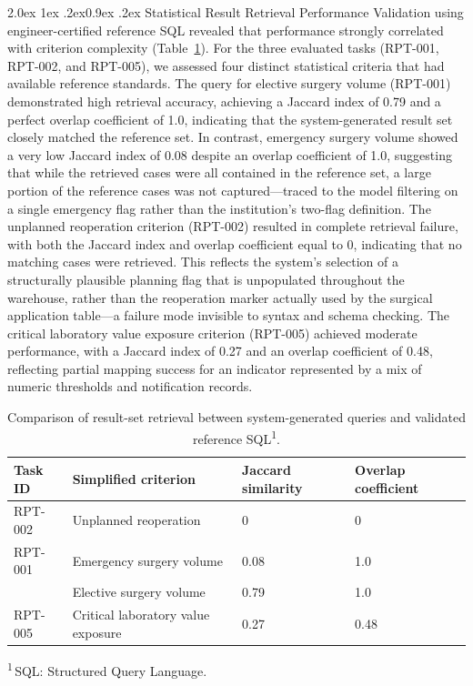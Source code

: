 \documentclass[10pt]{article}
\makeatletter
\renewcommand\subsection{\@startsection{subsection}{2}{\z@}%
  {2.0ex \@plus 1ex \@minus .2ex}{0.9ex \@plus .2ex}%
  {\normalfont\normalsize\bfseries}}
\newcommand{\tnote}[1]{\textsuperscript{#1}}
\newcommand{\tabfoot}[1]{\par\vspace{2pt}\begingroup\raggedright\footnotesize
  \noindent #1\par\endgroup}
\newcommand{\tnotedef}[1]{\textsuperscript{#1}\,}
\makeatother
\begin{document}
\subsection{Statistical Result Retrieval Performance}
Validation using engineer-certified reference SQL revealed that performance
strongly correlated with criterion complexity (Table~\ref{tab:retrieval}). For
the three evaluated tasks (RPT-001, RPT-002, and RPT-005), we assessed four
distinct statistical criteria that had available reference standards. The query
for elective surgery volume (RPT-001) demonstrated high retrieval accuracy,
achieving a Jaccard index of 0.79 and a perfect overlap coefficient of 1.0,
indicating that the system-generated result set closely matched the reference
set. In contrast, emergency surgery volume showed a very low Jaccard index of 0.08 despite an overlap coefficient of 1.0, suggesting that while the retrieved
cases were all contained in the reference set, a large portion of the reference
cases was not captured---traced to the model filtering on a single emergency
flag rather than the institution's two-flag definition. The unplanned
reoperation criterion (RPT-002) resulted in complete retrieval failure, with
both the Jaccard index and overlap coefficient equal to 0, indicating that no
matching cases were retrieved. This reflects the system's selection of a
structurally plausible planning flag that is unpopulated throughout the
warehouse, rather than the reoperation marker actually used by the surgical
application table---a failure mode invisible to syntax and schema checking. The
critical laboratory value exposure criterion (RPT-005) achieved moderate
performance, with a Jaccard index of 0.27 and an overlap coefficient of 0.48,
reflecting partial mapping success for an indicator represented by a mix of
numeric thresholds and notification records.

\begin{table}[!ht]
\caption{Comparison of result-set retrieval between system-generated queries and
validated reference SQL\tnote{1}.}
\label{tab:retrieval}
\centering
\footnotesize
\begin{tabular*}{\linewidth}{@{\extracolsep{\fill}}llll@{}}
\toprule
Task ID & Simplified criterion & Jaccard similarity & Overlap coefficient\\
\midrule
RPT-002 & Unplanned reoperation                & 0    & 0\\
RPT-001 & Emergency surgery volume             & 0.08 & 1.0\\
        & Elective surgery volume              & 0.79 & 1.0\\
RPT-005 & Critical laboratory value exposure   & 0.27 & 0.48\\
\bottomrule
\end{tabular*}
\tabfoot{\tnotedef{1}SQL: Structured Query Language.}
\end{table}
\end{document}
